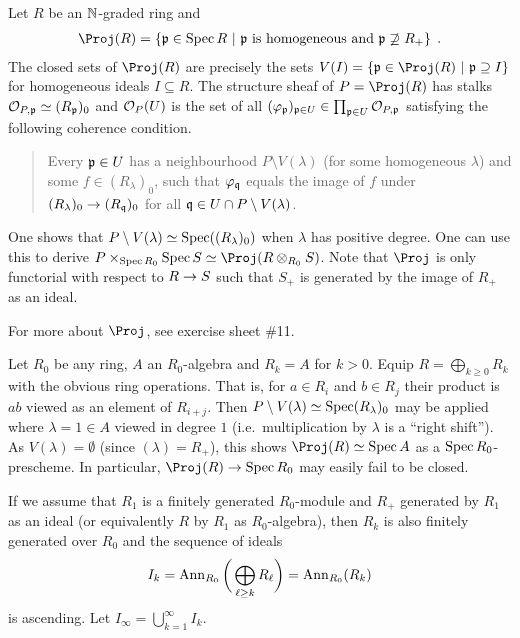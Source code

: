 \documentclass[a4paper,parskip=half,numbers=enddot, DIV=12]{scrreprt}
\begin{document}
\begin{example}
    Let $R$ be an $\mathbb{N}$-graded ring and 
    \begin{align*}
        \Proj(R) = \left\{\pp\in\Spec R \st \pp \text{ is homogeneous and } \pp\not \supseteq R_+\right\}\;.
    \end{align*}
    The closed sets of $\Proj(R)$ are precisely the sets $V(I)=\left\{\pp\in\Proj(R)\st \pp\supseteq I\right\}$ for homogeneous ideals $I\subseteq R$. The structure sheaf of $P=\Proj (R)$ has stalks $\mathcal{O}_{P,\mathfrak{p}} \simeq (R_{\mathfrak{p}})_0$ and $\mathcal{O}_P(U)$ is the set of all $(\varphi_{\mathfrak{p}})_{\mathfrak{p}\in U}\in \prod_{\mathfrak{p}\in U} \mathcal{O}_{P,\mathfrak{p}}$ satisfying the following coherence condition. 
    \begin{quote}
    	Every $\mathfrak{p}\in U$ has a neighbourhood $P\setminus V(\lambda)$ (for some homogeneous $\lambda$) and some $f\in (R_\lambda)_0$, such that $\varphi_{\mathfrak{q}}$ equals the image of $f$ under $(R_\lambda)_0 \morphism (R_\qq)_0$ for all $\mathfrak{q}\in U\cap P\setminus V(\lambda)$. 
    \end{quote}
    One shows that $P\setminus V(\lambda) \simeq \operatorname{Spec}((R_\lambda)_0)$ when $\lambda$ has positive degree. One can use this to derive $P\times_{\Spec R_0} \Spec S \simeq \Proj(R\otimes_{R_0} S)$. Note that $\Proj$ is only functorial with respect to $R\morphism S$ such that $S_+$ is generated by the image of $R_+$ as an ideal.
    
    For more about $\Proj$, see exercise sheet \#11.
\end{example}
\begin{example}
    Let $R_0$ be any ring, $A$ an $R_0$-algebra and $R_k = A$ for $k>0$. Equip $R=\bigoplus_{k\geq 0}R_k$ with the obvious ring operations. That is, for $a\in R_i$ and $b\in R_j$ their product is $ab$ viewed as an element of $R_{i+j}$. Then $P\setminus V(\lambda) \simeq \operatorname{Spec}(R_\lambda)_0$ may be applied where $\lambda = 1\in A$ viewed in degree $1$ (i.e.\ multiplication by $\lambda$ is a ``right shift''). As $V(\lambda)=\emptyset$ (since $(\lambda)=R_+$), this shows $\Proj(R)\simeq \Spec A$ as a $\operatorname{Spec} R_0$-prescheme. In particular, $\Proj(R)\morphism \Spec R_0$ may easily fail to be closed.
\end{example}
If we assume that $R_1$ is a finitely generated $R_0$-module and $R_+$ generated by $R_1$ as an ideal (or equivalently $R$ by $R_1$ as $R_0$-algebra), then $R_k$ is also finitely generated over $R_0$ and the sequence of ideals 
\begin{align*}
    I_k = \operatorname{Ann}_{R_0}\bigg(\bigoplus_{\ell\geq k} R_\ell\bigg) = \operatorname{Ann}_{R_0} (R_k)
\end{align*}
is ascending. Let $I_\infty = \bigcup_{k=1}^\infty I_k$.
\end{document}
